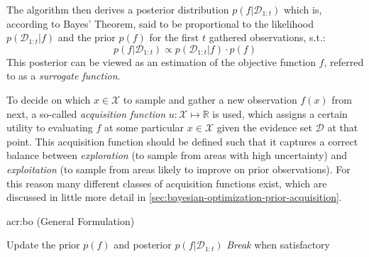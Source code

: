 The algorithm then derives a posterior distribution $p(f \vert \mathcal{D}_{1:t})$ which is, according to Bayes' Theorem, said to be proportional to the likelihood $p(\mathcal{D}_{1:t} \vert f)$ and the prior $p(f)$ for the first $t$ gathered observations, s.t.:
\begin{equation}
	p(f \vert \mathcal{D}_{1:t}) \propto p(\mathcal{D}_{1:t} \vert f) \cdot p(f)
\end{equation}
This posterior can be viewed as an estimation of the objective function $f$, referred to as a \textit{surrogate function}.

To decide on which $x \in \mathcal{X}$ to sample and gather a new observation $f(x)$ from next, a so-called \textit{acquisition function} $u: \mathcal{X} \mapsto \mathbb{R}$ is used, which assigns a certain utility to evaluating $f$ at some particular $x \in \mathcal{X}$ given the evidence set $\mathcal{D}$ at that point.
This acquisition function should be defined such that it captures a correct balance between \textit{exploration} (to sample from areas with high uncertainty) and \textit{exploitation} (to sample from areas likely to improve on prior observations). For this reason many different classes of acquisition functions exist, which are discussed in little more detail in \autoref{sec:bayesian-optimization-prior-acquisition}.


\begin{algorithm}[!t]
	\caption{\acrlong{acr:bo} (General Formulation) \label{alg:bayesian-optimization}}
	\begin{algorithmic}[1]
		 
			 
			\State Update the prior $p(f)$ and posterior $p(f \vert \mathcal{D}_{1:t})$
			\State \textit{Break} when satisfactory 
		\EndFor
		\State {}
	\end{algorithmic}
\end{algorithm}


